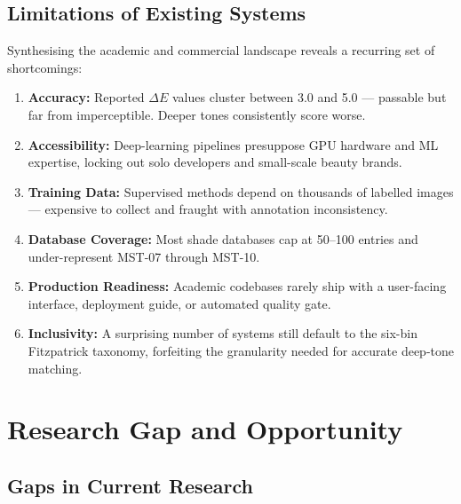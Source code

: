 \subsection{Limitations of Existing Systems}

Synthesising the academic and commercial landscape reveals a recurring set of shortcomings:

\begin{enumerate}
    \item \textbf{Accuracy:} Reported $\Delta E$ values cluster between 3.0 and 5.0 — passable but far from imperceptible. Deeper tones consistently score worse.
    
    \item \textbf{Accessibility:} Deep-learning pipelines presuppose GPU hardware and ML expertise, locking out solo developers and small-scale beauty brands.
    
    \item \textbf{Training Data:} Supervised methods depend on thousands of labelled images — expensive to collect and fraught with annotation inconsistency.
    
    \item \textbf{Database Coverage:} Most shade databases cap at 50–100 entries and under-represent MST-07 through MST-10.
    
    \item \textbf{Production Readiness:} Academic codebases rarely ship with a user-facing interface, deployment guide, or automated quality gate.
    
    \item \textbf{Inclusivity:} A surprising number of systems still default to the six-bin Fitzpatrick taxonomy, forfeiting the granularity needed for accurate deep-tone matching.
\end{enumerate}

\section{Research Gap and Opportunity}

\subsection{Gaps in Current Research}

